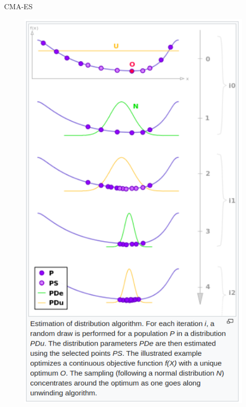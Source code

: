 \documentclass[11pt,compress,t,notes=noshow, xcolor=table]{beamer}
\begin{document}
\begin{frame}{CMA-ES}
\begin{minipage}{0.62\textwidth}
\end{minipage}\hfill
\begin{minipage}{0.35\textwidth}\raggedleft
\begin{figure}
  \includegraphics[width=1\textwidth, height=0.9\textheight]{figure_man/cmaes/cmaes_eda.png}
\end{figure}
\end{minipage}

\end{frame}
\end{document}
